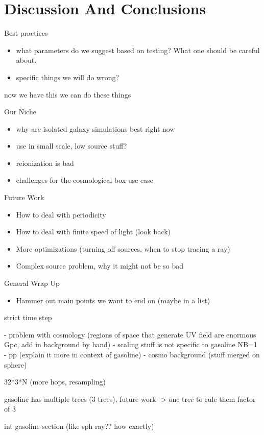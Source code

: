 \documentclass[fleq,usenatbib]{mnras}
\begin{document}
\section{Discussion And Conclusions}\label{sec:disc}
\noindent Best practices
\begin{itemize}
\item what parameters do we suggest based on testing? What one should be 
careful about.
\item specific things we will do wrong?
\end{itemize}

now we have this we can do these things

\noindent Our Niche
\begin{itemize}
\item why are isolated galaxy simulations best right now
\item use in small scale, low source stuff?
\item reionization is bad
\item challenges for the cosmological box use case 
\end{itemize}

\noindent Future Work
\begin{itemize}
\item How to deal with periodicity
\item How to deal with finite speed of light (look back)
\item More optimizations (turning off sources, when to stop tracing a ray)
\item Complex source problem, why it might not be so bad
\end{itemize}

\noindent General Wrap Up
\begin{itemize}
\item Hammer out main points we want to end on (maybe in a list)
\end{itemize}

strict time step

- problem with cosmology (regions of space that generate UV field are 
enormous Gpc, add in background by hand)
- scaling stuff is not specific to gasoline NB=1
- pp (explain it more in context of gasoline)
- cosmo background (stuff merged on sphere)

32*3*N (more hops, resampling)

gasoline has multiple trees (3 trees), future work -> one tree to rule them 
factor of 3

int gasoline section (like sph ray?? how exactly)
\end{document}
